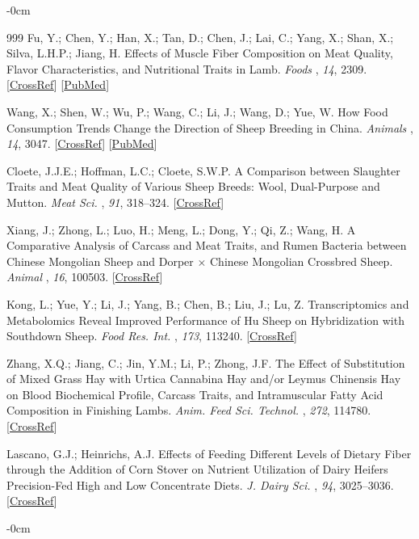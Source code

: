 \documentclass[animals,article,accept,moreauthors,pdftex]{Definitions/mdpi}
\begin{document}
\begin{adjustwidth}{-\extralength}{0cm}

\begin{thebibliography}{999}
Fu, Y.; Chen, Y.; Han, X.; Tan, D.; Chen, J.; Lai, C.; Yang, X.; Shan, X.; Silva, L.H.P.; Jiang, H. Effects of Muscle Fiber Composition on Meat Quality, Flavor Characteristics, and Nutritional Traits in Lamb. \emph{Foods} \textbf{}, \emph{14}, 2309. [\href{https://doi.org/10.3390/foods14132309}{CrossRef}] [\href{https://www.ncbi.nlm.nih.gov/pubmed/40647060}{PubMed}]

Wang, X.; Shen, W.; Wu, P.; Wang, C.; Li, J.; Wang, D.; Yue, W. How Food Consumption Trends Change the Direction of Sheep Breeding in China. \emph{Animals} \textbf{}, \emph{14}, 3047. [\href{https://doi.org/10.3390/ani14213047}{CrossRef}] [\href{https://www.ncbi.nlm.nih.gov/pubmed/39518770}{PubMed}]

Cloete, J.J.E.; Hoffman, L.C.; Cloete, S.W.P. A Comparison between Slaughter Traits and Meat Quality of Various Sheep Breeds: Wool, Dual-Purpose and Mutton. \emph{Meat Sci.} \textbf{}, \emph{91}, 318--324. [\href{https://doi.org/10.1016/j.meatsci.2012.02.010}{CrossRef}]

Xiang, J.; Zhong, L.; Luo, H.; Meng, L.; Dong, Y.; Qi, Z.; Wang, H. A Comparative Analysis of Carcass and Meat Traits, and Rumen Bacteria between Chinese Mongolian Sheep and Dorper $\times$ Chinese Mongolian Crossbred Sheep. \emph{Animal} \textbf{}, \emph{16}, 100503. [\href{https://doi.org/10.1016/j.animal.2022.100503}{CrossRef}]

Kong, L.; Yue, Y.; Li, J.; Yang, B.; Chen, B.; Liu, J.; Lu, Z. Transcriptomics and Metabolomics Reveal Improved Performance of Hu Sheep on Hybridization with Southdown Sheep. \emph{Food Res. Int.} \textbf{}, \emph{173}, 113240. [\href{https://doi.org/10.1016/j.foodres.2023.113240}{CrossRef}]

Zhang, X.Q.; Jiang, C.; Jin, Y.M.; Li, P.; Zhong, J.F. The Effect of Substitution of Mixed Grass Hay with Urtica Cannabina Hay and/or Leymus Chinensis Hay on Blood Biochemical Profile, Carcass Traits, and Intramuscular Fatty Acid Composition in Finishing Lambs. \emph{Anim. Feed Sci. Technol.} \textbf{}, \emph{272}, 114780. [\href{https://doi.org/10.1016/j.anifeedsci.2020.114780}{CrossRef}]

Lascano, G.J.; Heinrichs, A.J. Effects of Feeding Different Levels of Dietary Fiber through the Addition of Corn Stover on Nutrient Utilization of Dairy Heifers Precision-Fed High and Low Concentrate Diets. \emph{J. Dairy Sci.} \textbf{}, \emph{94}, 3025--3036. [\href{https://doi.org/10.3168/jds.2010-3831}{CrossRef}]



\end{thebibliography}
\end{adjustwidth}
\begin{adjustwidth}{-\extralength}{0cm}
\PublishersNote{}
\end{adjustwidth}
\end{document}
